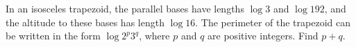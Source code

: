 In an isosceles trapezoid, the parallel bases have lengths $\log3$ and $\log192$, and the altitude to these bases has length $\log16$. The perimeter of the trapezoid can be written in the form $\log2^p3^q$, where $p$ and $q$ are positive integers. Find $p+q$.